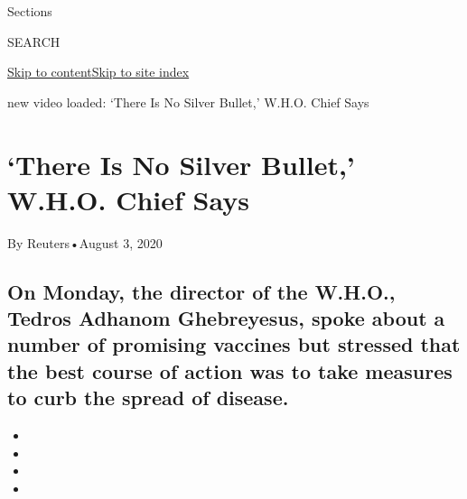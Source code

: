 Sections

SEARCH

\protect\hyperlink{site-content}{Skip to
content}\protect\hyperlink{site-index}{Skip to site index}

new video loaded: `There Is No Silver Bullet,' W.H.O. Chief Says

\hypertarget{there-is-no-silver-bullet-who-chief-says}{%
\section{`There Is No Silver Bullet,' W.H.O. Chief
Says}\label{there-is-no-silver-bullet-who-chief-says}}

By Reuters•August 3, 2020

\hypertarget{on-monday-the-director-of-the-who-tedros-adhanom-ghebreyesus-spoke-about-a-number-of-promising-vaccines-but-stressed-that-the-best-course-of-action-was-to-take-measures-to-curb-the-spread-of-disease}{%
\subsection{On Monday, the director of the W.H.O., Tedros Adhanom
Ghebreyesus, spoke about a number of promising vaccines but stressed
that the best course of action was to take measures to curb the spread
of
disease.}\label{on-monday-the-director-of-the-who-tedros-adhanom-ghebreyesus-spoke-about-a-number-of-promising-vaccines-but-stressed-that-the-best-course-of-action-was-to-take-measures-to-curb-the-spread-of-disease}}

\begin{itemize}
\item
\item
\item
\item
\end{itemize}

